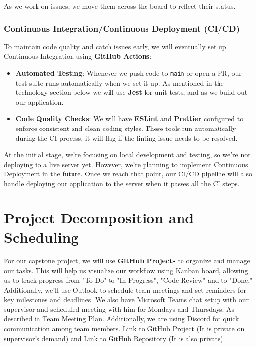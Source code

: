 \documentclass{article}
\begin{document}
As we work on issues, we move them across the board to reflect their status.

\subsubsection{Continuous Integration/Continuous Deployment (CI/CD)}

To maintain code quality and catch issues early, we will eventually set up Continuous Integration using \textbf{GitHub Actions}:

\begin{itemize}
    \item \textbf{Automated Testing}: Whenever we push code to \texttt{main} or open a PR, our test suite runs automatically when we set it up. As mentioned in the technology section below we will use \textbf{Jest} for unit tests, and as we build out our application.

    \item \textbf{Code Quality Checks}: We will have \textbf{ESLint} and \textbf{Prettier} configured to enforce consistent and clean coding styles. These tools run automatically during the CI process, it will flag if the linting issue needs to be resolved. 
\end{itemize}

At the initial stage, we're focusing on local development and testing, so we're not deploying to a live server yet. However, we're planning to implement Continuous Deployment in the future. Once we reach that point, our CI/CD pipeline will also handle deploying our application to the server when it passes all the CI steps.

\section{Project Decomposition and Scheduling}

For our capstone project, we will use \textbf{GitHub Projects} to organize and manage our tasks. This will help us visualize our workflow using Kanban board, allowing us to track progress from "To Do" to "In Progress", "Code Review" and to "Done." Additionally, we’ll use Outlook to schedule team meetings and set reminders for key milestones and deadlines. We also have Microsoft Teams chat setup with our supervisor and scheduled meeting with him for Mondays and Thursdays. As described in Team Meeting Plan. Additionally, we are using Discord for quick communication among team members. \href{https://github.com/users/MadhuranS/projects/1}{Link to GitHub Project (It is private on supervisor's demand)} and \href{https://github.com/MadhuranS/capstone}{Link to GitHub Repository (It is also private)}
\end{document}
